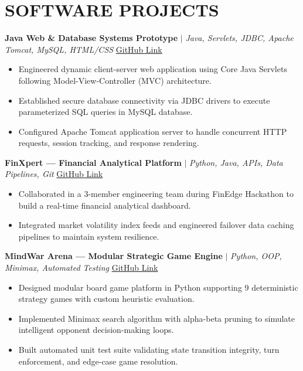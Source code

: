 \documentclass[10pt,letterpaper]{article}
\begin{document}
\section*{SOFTWARE PROJECTS}
{\small
\textbf{Java Web \& Database Systems Prototype} $|$ \textit{Java, Servlets, JDBC, Apache Tomcat, MySQL, HTML/CSS} \hfill \href{https://github.com/sankalpjadhav24}{GitHub Link}
\begin{itemize}[leftmargin=1.2em, itemsep=1.5pt, parsep=0pt, topsep=1pt]
    \item Engineered dynamic client-server web application using Core Java Servlets following Model-View-Controller (MVC) architecture.
    \item Established secure database connectivity via JDBC drivers to execute parameterized SQL queries in MySQL database.
    \item Configured Apache Tomcat application server to handle concurrent HTTP requests, session tracking, and response rendering.
\end{itemize}
\vspace{3pt}
\textbf{FinXpert — Financial Analytical Platform} $|$ \textit{Python, Java, APIs, Data Pipelines, Git} \hfill \href{https://github.com/sankalpjadhav24}{GitHub Link}
\begin{itemize}[leftmargin=1.2em, itemsep=1.5pt, parsep=0pt, topsep=1pt]
    \item Collaborated in a 3-member engineering team during FinEdge Hackathon to build a real-time financial analytical dashboard.
    \item Integrated market volatility index feeds and engineered failover data caching pipelines to maintain system resilience.
\end{itemize}
\vspace{3pt}
\textbf{MindWar Arena — Modular Strategic Game Engine} $|$ \textit{Python, OOP, Minimax, Automated Testing} \hfill \href{https://github.com/sankalpjadhav24}{GitHub Link}
\begin{itemize}[leftmargin=1.2em, itemsep=1.5pt, parsep=0pt, topsep=1pt]
    \item Designed modular board game platform in Python supporting 9 deterministic strategy games with custom heuristic evaluation.
    \item Implemented Minimax search algorithm with alpha-beta pruning to simulate intelligent opponent decision-making loops.
    \item Built automated unit test suite validating state transition integrity, turn enforcement, and edge-case game resolution.
\end{itemize}
}
\end{document}
